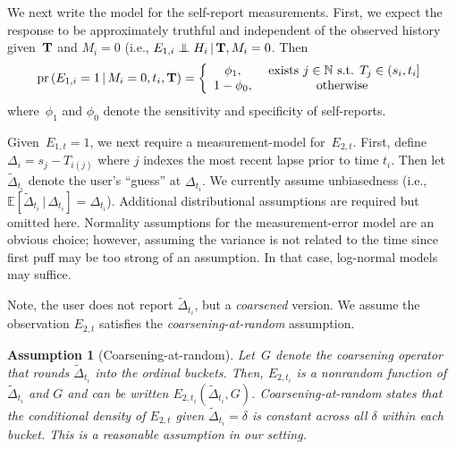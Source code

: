 \documentclass[11pt]{amsart}
\def\pr{\mathop{\text{pr}}\nolimits}
\def\pr{\mathop{\text{pr}}\nolimits}
\def\E{\mathcal{E}}
\newtheorem{assumption}[thm]{Assumption}
\def\indep{\mathrel{\rlap{$\perp$}\kern1.6pt\mathord{\perp}}}
\def\E{\mathbb{E}}
\def\given{\, | \,}
\def\Nat{\mathbb{N}}
\def\bfT{{\bf T}}
\begin{document}
We next write the model for the self-report measurements.
First, we expect the response to be approximately truthful and
independent of the observed history given~$\bfT$ and $M_{i} = 0$
(i.e., $E_{1,i} \indep H_{i} \given \bfT, M_{i} = 0$. Then
\[
\pr \left( E_{1,i} = 1 \given M_{i} = 0, t_i, \bfT \right) =  \left \{
  \begin{array}{c c}
    \phi_1, & \text{ exists } j \in \Nat \text{ s.t. } T_j \in (s_i, t_i] \\
    1-\phi_0, & \text{ otherwise } \\
  \end{array}
\right .
\]
where~$\phi_1$ and $\phi_0$ denote the sensitivity and specificity of
self-reports.  %

Given~$E_{1,t} = 1$, we next require a measurement-model
for~$E_{2,t}$.  First, define~$\Delta_{i} = s_j - T_{i(j)}$ where $j$
indexes the most recent lapse prior to time $t_i$.
Then let~$\tilde \Delta_{t_i}$ denote the user's ``guess'' at
$\Delta_{t_i}$.
We currently assume unbiasedness (i.e., $\E [ \tilde \Delta_{t_i}
\given \Delta_{t_i}] = \Delta_{t_i}$). Additional distributional
assumptions are required but omitted here.  Normality assumptions for the
measurement-error model are an obvious choice; however, assuming the
variance is not related to the time since first puff may be too strong
of an assumption.  In that case, log-normal models may suffice.

Note, the user does not report $\tilde \Delta_{t_i}$, but a
\emph{coarsened} version.  We assume the observation $E_{2,t}$
satisfies the \emph{coarsening-at-random} assumption.

\begin{assumption}[Coarsening-at-random] \normalfont
Let~$G$ denote the coarsening operator that rounds $\tilde
\Delta_{t_i}$ into the ordinal buckets.
Then, $E_{2,t_i}$ is a nonrandom function of $\tilde \Delta_{t_i}$
and $G$ and can be written $E_{2,t_i} (\tilde \Delta_{t_i}, G)$.
\emph{Coarsening-at-random} states that the conditional density of
$E_{2,t}$ given $\tilde \Delta_{t_i} = \delta$ is constant across all
$\delta$ within each bucket.
This is a reasonable assumption in our setting.
\end{assumption}
\end{document}
